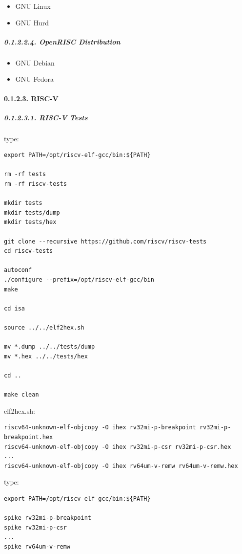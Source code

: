 \documentclass[
]{article}
\begin{document}
\begin{itemize}
\item
  GNU Linux
\item
  GNU Hurd
\end{itemize}

\hypertarget{openrisc-distribution-1}{%
\subparagraph{0.1.2.2.4. OpenRISC
Distribution}\label{openrisc-distribution-1}}

\begin{itemize}
\item
  GNU Debian
\item
  GNU Fedora
\end{itemize}

\hypertarget{risc-v-3}{%
\paragraph{0.1.2.3. RISC-V}\label{risc-v-3}}

\hypertarget{risc-v-tests-1}{%
\subparagraph{0.1.2.3.1. RISC-V Tests}\label{risc-v-tests-1}}

type:

\begin{verbatim}
export PATH=/opt/riscv-elf-gcc/bin:${PATH}

rm -rf tests
rm -rf riscv-tests

mkdir tests
mkdir tests/dump
mkdir tests/hex

git clone --recursive https://github.com/riscv/riscv-tests
cd riscv-tests

autoconf
./configure --prefix=/opt/riscv-elf-gcc/bin
make

cd isa

source ../../elf2hex.sh

mv *.dump ../../tests/dump
mv *.hex ../../tests/hex

cd ..

make clean
\end{verbatim}

elf2hex.sh:

\begin{verbatim}
riscv64-unknown-elf-objcopy -O ihex rv32mi-p-breakpoint rv32mi-p-breakpoint.hex
riscv64-unknown-elf-objcopy -O ihex rv32mi-p-csr rv32mi-p-csr.hex
...
riscv64-unknown-elf-objcopy -O ihex rv64um-v-remw rv64um-v-remw.hex
\end{verbatim}

type:

\begin{verbatim}
export PATH=/opt/riscv-elf-gcc/bin:${PATH}

spike rv32mi-p-breakpoint
spike rv32mi-p-csr
...
spike rv64um-v-remw
\end{verbatim}
\end{document}
